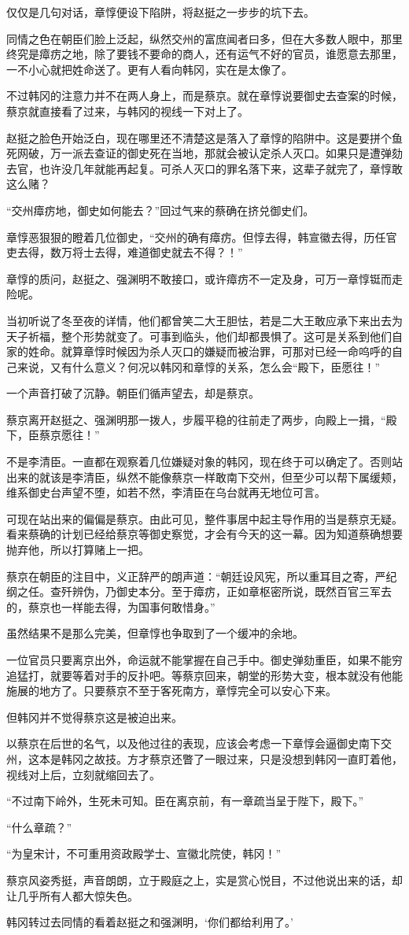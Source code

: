 仅仅是几句对话，章惇便设下陷阱，将赵挺之一步步的坑下去。

同情之色在朝臣们脸上泛起，纵然交州的富庶闻者曰多，但在大多数人眼中，那里终究是瘴疠之地，除了要钱不要命的商人，还有运气不好的官员，谁愿意去那里，一不小心就把姓命送了。更有人看向韩冈，实在是太像了。

不过韩冈的注意力并不在两人身上，而是蔡京。就在章惇说要御史去查案的时候，蔡京就直接看了过来，与韩冈的视线一下对上了。

赵挺之脸色开始泛白，现在哪里还不清楚这是落入了章惇的陷阱中。这是要拼个鱼死网破，万一派去查证的御史死在当地，那就会被认定杀人灭口。如果只是遭弹劾去官，也许没几年就能再起复。可杀人灭口的罪名落下来，这辈子就完了，章惇敢这么赌？

“交州瘴疠地，御史如何能去？”回过气来的蔡确在挤兑御史们。

章惇恶狠狠的瞪着几位御史，“交州的确有瘴疠。但惇去得，韩宣徽去得，历任官吏去得，数万将士去得，难道御史就去不得？！”

章惇的质问，赵挺之、强渊明不敢接口，或许瘴疠不一定及身，可万一章惇铤而走险呢。

当初听说了冬至夜的详情，他们都曾笑二大王胆怯，若是二大王敢应承下来出去为天子祈福，整个形势就变了。可事到临头，他们却都畏惧了。这可是关系到他们自家的姓命。就算章惇时候因为杀人灭口的嫌疑而被治罪，可那对已经一命呜呼的自己来说，又有什么意义？何况以韩冈和章惇的关系，怎么会“殿下，臣愿往！”

一个声音打破了沉静。朝臣们循声望去，却是蔡京。

蔡京离开赵挺之、强渊明那一拨人，步履平稳的往前走了两步，向殿上一揖，“殿下，臣蔡京愿往！”

不是李清臣。一直都在观察着几位嫌疑对象的韩冈，现在终于可以确定了。否则站出来的就该是李清臣，纵然不能像蔡京一样敢南下交州，但至少可以帮下属缓颊，维系御史台声望不堕，如若不然，李清臣在乌台就再无地位可言。

可现在站出来的偏偏是蔡京。由此可见，整件事居中起主导作用的当是蔡京无疑。看来蔡确的计划已经给蔡京等御史察觉，才会有今天的这一幕。因为知道蔡确想要抛弃他，所以打算赌上一把。

蔡京在朝臣的注目中，义正辞严的朗声道：“朝廷设风宪，所以重耳目之寄，严纪纲之任。查歼辨伪，乃御史本分。至于瘴疠，正如章枢密所说，既然百官三军去的，蔡京也一样能去得，为国事何敢惜身。”

虽然结果不是那么完美，但章惇也争取到了一个缓冲的余地。

一位官员只要离京出外，命运就不能掌握在自己手中。御史弹劾重臣，如果不能穷追猛打，就要等着对手的反扑吧。等蔡京回来，朝堂的形势大变，根本就没有他能施展的地方了。只要蔡京不至于客死南方，章惇完全可以安心下来。

但韩冈并不觉得蔡京这是被迫出来。

以蔡京在后世的名气，以及他过往的表现，应该会考虑一下章惇会逼御史南下交州，这本是韩冈之故技。方才蔡京还瞥了一眼过来，只是没想到韩冈一直盯着他，视线对上后，立刻就缩回去了。

“不过南下岭外，生死未可知。臣在离京前，有一章疏当呈于陛下，殿下。”

“什么章疏？”

“为皇宋计，不可重用资政殿学士、宣徽北院使，韩冈！”

蔡京风姿秀挺，声音朗朗，立于殿庭之上，实是赏心悦目，不过他说出来的话，却让几乎所有人都大惊失色。

韩冈转过去同情的看着赵挺之和强渊明，‘你们都给利用了。’

